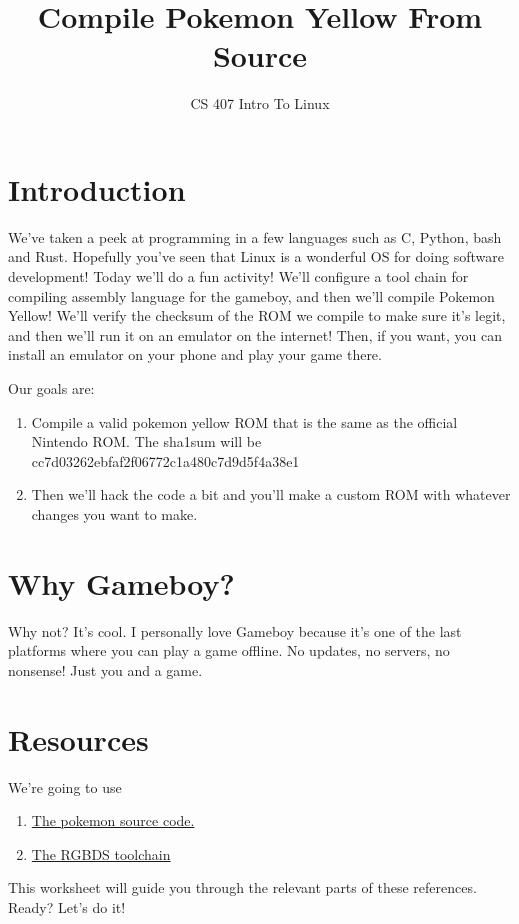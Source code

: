 \documentclass[12pt,a4]{article}
\begin{document}
\title{Compile Pokemon Yellow From Source}
\author{CS 407 Intro To Linux}
\maketitle

\section{Introduction}
We've taken a peek at programming in a few languages such as C, Python, bash and Rust. Hopefully you've seen that Linux is a wonderful OS for doing software development! Today we'll do a fun activity! We'll configure a tool chain for compiling assembly language for the gameboy, and then we'll compile Pokemon Yellow! We'll verify the checksum of the ROM we compile to make sure it's legit, and then we'll run it on an emulator on the internet! Then, if you want, you can install an emulator on your phone and play your game there.

Our goals are:
\begin{enumerate}
    \item Compile a valid pokemon yellow ROM that is the same as the official Nintendo ROM. The sha1sum will be cc7d03262ebfaf2f06772c1a480c7d9d5f4a38e1
    \item Then we'll hack the code a bit and you'll make a custom ROM with whatever changes you want to make.
\end{enumerate}

\section{Why Gameboy?}
Why not? It's cool. I personally love Gameboy because it's one of the last platforms where you can play a game offline. No updates, no servers, no nonsense! Just you and a game. 

\section{Resources}
We're going to use
\begin{enumerate}
    \item \href{https://github.com/pret/pokeyellow/tree/master}{The pokemon source code.}
    \item \href{https://rgbds.gbdev.io/install/linux}{The RGBDS toolchain}
\end{enumerate}

This worksheet will guide you through the relevant parts of these references. Ready? Let's do it!
\end{document}
